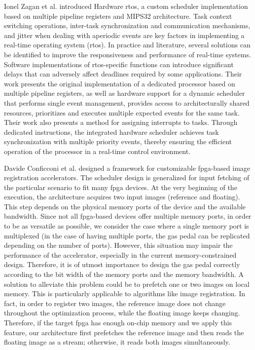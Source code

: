 Ionel Zagan et al. introduced Hardware \gls{rtos}, a custom scheduler implementation based on multiple pipeline registers and MIPS32 architecture\cite{Zagan2020}. Task context switching operations, inter-task synchronization and communication mechanisms, and jitter when dealing with aperiodic events are key factors in implementing a real-time operating system (\gls{rtos}). In practice and literature, several solutions can be identified to improve the responsiveness and performance of real-time systems\cite{dodiu2012custom}. Software implementations of \gls{rtos}-specific functions can introduce significant delays that can adversely affect deadlines required by some applications. Their work presents the original implementation of a dedicated processor based on multiple pipeline registers, as well as hardware support for a dynamic scheduler that performs single event management, provides access to architecturally shared resources, prioritizes and executes multiple expected events for the same task\cite{Zagan2019}. Their work also presents a method for assigning interrupts to tasks. Through dedicated instructions, the integrated hardware scheduler achieves task synchronization with multiple priority events, thereby ensuring the efficient operation of the processor in a real-time control environment.

Davide Conficconi et al. designed a framework for customizable \gls{fpga}-based image registration accelerators\cite{Conficconi2021}. The scheduler design is generalized for input fetching of the particular scenario to fit many \gls{fpga} devices. At the very beginning of the execution, the architecture acquires two input images (reference and floating). This step depends on the physical memory ports of the device and the available bandwidth. Since not all \gls{fpga}-based devices offer multiple memory ports, in order to be as versatile as possible, we consider the case where a single memory port is multiplexed (in the case of having multiple ports, the gas pedal can be replicated depending on the number of ports). However, this situation may impair the performance of the accelerator, especially in the current memory-constrained design. Therefore, it is of utmost importance to design the gas pedal correctly according to the bit width of the memory ports and the memory bandwidth. A solution to alleviate this problem could be to prefetch one or two images on local memory. This is particularly applicable to algorithms like image registration. In fact, in order to register two images, the reference image does not change throughout the optimization process, while the floating image keeps changing. Therefore, if the target \gls{fpga} has enough on-chip memory and we apply this feature, our architecture first prefetches the reference image and then reads the floating image as a stream; otherwise, it reads both images simultaneously.

